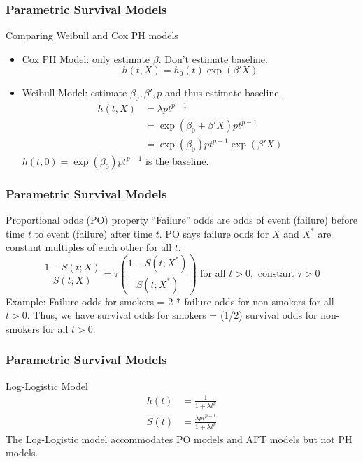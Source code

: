 \documentclass{beamer}
\theoremstyle{definition}
\begin{document}
\begin{frame}
\frametitle{Parametric Survival Models}
\begin{block}{Comparing Weibull and Cox PH models}
\begin{itemize}
\item Cox PH Model: only estimate $\beta$. Don't estimate baseline.
\[
h(t,X) = h_0(t)\exp(\beta'X)
\]
\item Weibull Model: estimate $\beta_0, \beta', p$ and thus estimate baseline.
\begin{align*}
h(t,X) &= \lambda p  t^{p-1} \\
&=\exp(\beta_0 + \beta'X)p t^{p-1} \\
&=\exp(\beta_0)p t^{p-1} \exp(\beta'X)
\end{align*}
$h(t,0) = \exp(\beta_0)p t^{p-1}$ is the baseline.
\end{itemize}
\end{block}
\end{frame}

\begin{frame}
\frametitle{Parametric Survival Models}
\begin{block}{Proportional odds (PO) property}
``Failure'' odds are odds of event (failure) before time $t$ to event (failure) after time $t$. PO says failure odds for $X$ and $X^*$ are constant multiples of each other for all $t$.
\[ \frac{1- S(t;X)}{S(t;X)} = \tau \left(\frac{1- S(t;X^*)}{S(t;X^*)}\right)  \text{ for all } t>0, \text{ constant } \tau > 0
\]
Example: Failure odds for smokers = 2 * failure odds for non-smokers for all $t>0$. Thus, we have survival odds for smokers = (1/2) survival odds for non-smokers for all $t>0$.
\end{block}
\end{frame}

\begin{frame}
\frametitle{Parametric Survival Models}
\begin{block}{Log-Logistic Model}
\vspace{-20pt}
\begin{align*}
h(t)&=\frac{1}{1+\lambda t^p}  \\
S(t)&= \frac{\lambda p t^{p-1}}{1+\lambda t^p}
\end{align*}
The Log-Logistic model accommodates PO models and AFT models but not PH models.
\end{block}
\end{frame}
\end{document}
